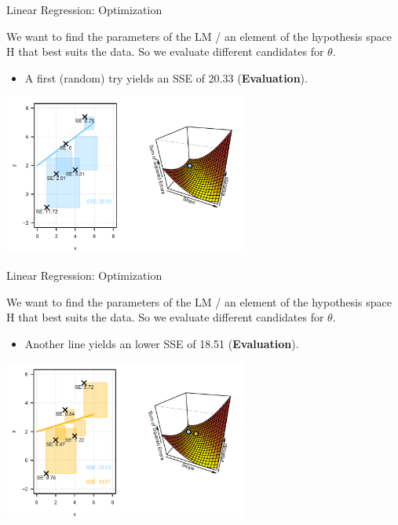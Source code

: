 \begin{frame}{Linear Regression: Optimization}

We want to find the parameters of the LM / an element of the hypothesis
space H that best suits the data. So we evaluate different candidates
for \(\theta\).

\begin{itemize}
\item
  A first (random) try yields an SSE of 20.33 (\textbf{Evaluation}).
\end{itemize}

\begin{center}
\includegraphics[width=0.6\textwidth]{plots/lin-reg-optim01.png}
\end{center}


\end{frame}


\begin{frame}{Linear Regression: Optimization}

We want to find the parameters of the LM / an element of the hypothesis
space H that best suits the data. So we evaluate different candidates
for \(\theta\).

\begin{itemize}
\item
  Another line yields an lower SSE of 18.51 (\textbf{Evaluation}).
\end{itemize}

\begin{center}
\includegraphics[width=0.6\textwidth]{plots/lin-reg-optim02.png}
\end{center}

\end{frame}

